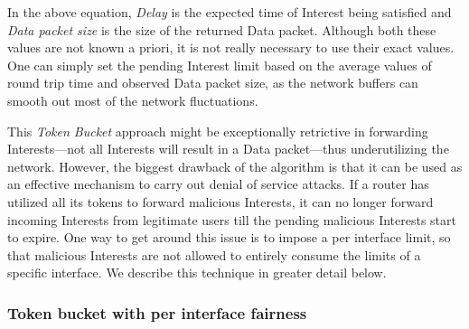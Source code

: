 In the above equation, \emph{Delay} is the expected time of Interest being satisfied and \emph{Data packet size} is the size of the returned Data packet.
Although both these values are not known a priori, it is not really necessary to use their exact values.
One can simply set the pending Interest limit based on the average values of round trip time and observed Data packet size, as the network buffers can smooth out most of the network fluctuations.

This {\it Token Bucket} approach might be exceptionally retrictive in forwarding Interests---not all Interests will result in a Data packet---thus underutilizing the network. However, the biggest drawback of the algorithm is that it can be used as an effective mechanism to carry out denial of service attacks. If a router has utilized all its tokens to forward malicious Interests, it can no longer forward incoming Interests from legitimate users till the pending malicious Interests start to expire. One way to get around this issue is to impose a per interface limit, so that malicious Interests are not allowed to entirely consume the limits of a specific interface. We describe this technique in greater detail below.

%
%
%




\subsubsection{\textbf{Token bucket with per interface fairness}}
\label{sec:queuing}


